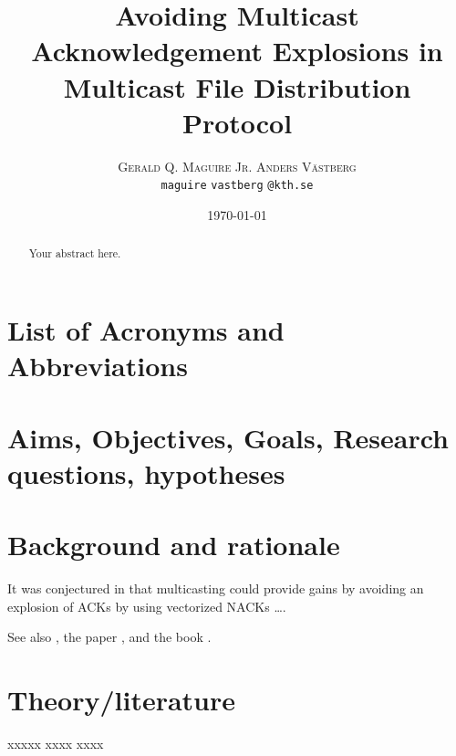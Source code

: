 \documentclass[12pt,twoside,english]{article}
\title{Avoiding Multicast Acknowledgement Explosions in Multicast File Distribution Protocol}
\author{
        \textsc{Gerald Q. Maguire Jr.}
            \qquad
        \textsc{Anders Västberg}
        \mbox{}\\
        \normalsize
            \texttt{maguire}
        \textbar{}
            \texttt{vastberg}
        \normalsize
            \texttt{@kth.se}
}
\date{\today}
\begin{document}
\maketitle


\begin{abstract}
\label{sec:abstract}

Your abstract here.

\end{abstract}

\tableofcontents

\section*{List of Acronyms and Abbreviations}
\label{list-of-acronyms-and-abbreviations}
\renewcommand{\glossarysection}[2][]{} %
\printglossary[type=\acronymtype,nonumberlist]


\clearpage
\section{Aims, Objectives, Goals, Research questions, hypotheses}
\label{sec:aims}

\section{Background and rationale}
\label{sec:background}

It was conjectured in \cite{john_ioannidis_coherent_1991} that multicasting
could provide gains by avoiding an explosion of \glspl{ACK} by using vectorized \glspl{NACK} \ldots.

See also \cite{a_new_synchronization_protocol_for_sqlite_databases},
the paper \cite{anand_kannan_n-ary_2012}, 
and the book \cite{brent_s._baxter_standard_1982}.

\section{Theory/literature}
\label{sect:framework}

xxxxx xxxx xxxx 
\end{document}
